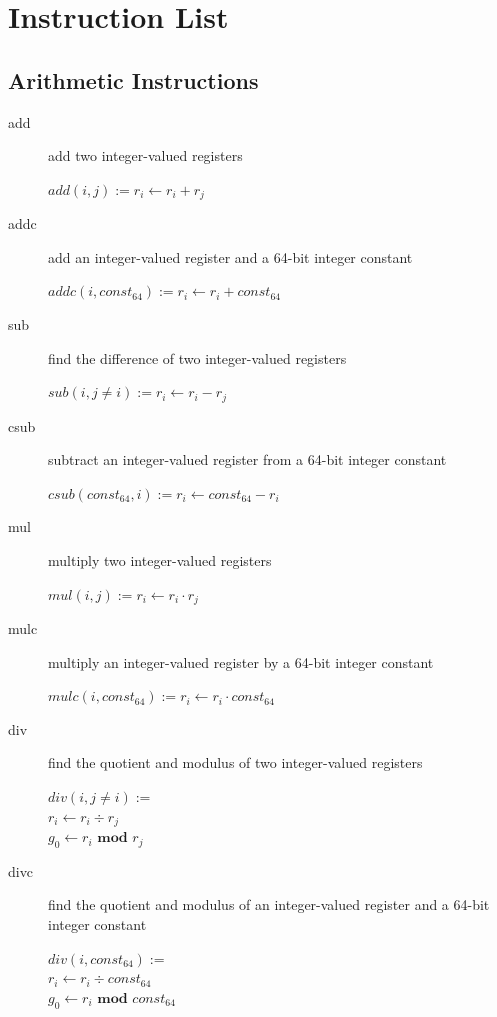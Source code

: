 \documentclass[english,a4paper]{report}
\begin{document}
\chapter{Instruction List} 

\section{Arithmetic Instructions}
\begin{description}
	\item[add] add two integer-valued registers
	
	$add(i, j) := r _{i} \longleftarrow  r _{i} + r_{j} $ \\
	
	\item[addc] add an integer-valued register and a 64-bit integer
	constant
	
	$addc(i, const _{64}) := r _{i} \longleftarrow  r _{i} + const 
	_{64} $ \\
	
	\item[sub] find the difference of two integer-valued registers
	
	$sub(i, j\neq i) := r _{i} \longleftarrow  r _{i} - r _{j} $ \\
	
	\item[csub] subtract an integer-valued register from a 64-bit 
	integer
	constant
	
	$csub(const _{64}, i) := r _{i} \longleftarrow const _{64} - r 
	_{i} $ \\
	
	\item[mul] multiply two integer-valued registers
	
	$mul(i, j) := r _{i} \longleftarrow  r _{i} \cdot r _{j} $ \\
	
	\item[mulc] multiply an integer-valued register by a 64-bit 
	integer
	constant
	
	$mulc(i, const _{64}) := r _{i} \longleftarrow r _{i} \cdot const 
	_{64} $
	
	\item[div] find the quotient and modulus of two integer-valued
	registers
	
	$div(i, j\neq i) :=$ \\
	$ r _{i} \longleftarrow  r _{i} \div r _{j}$ \\
	$ g _{0} \longleftarrow  r _{i} \textbf{ mod } r _{j} $\\
	
	\item[divc] find the quotient and modulus of an integer-valued
	register and a 64-bit integer constant
	
	$div(i, const _{64}) :=$ \\
	$ r _{i} \longleftarrow  r _{i} \div const_{64}$ \\
	$ g _{0} \longleftarrow r _{i} \textbf{ mod } const_{64} $
	
\end{description}
\end{document}
